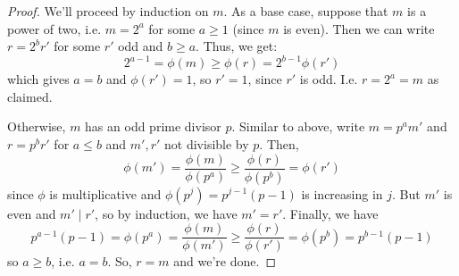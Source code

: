 \begin{proof}
    We'll proceed by induction on $m$. As a base case, suppose that $m$ is a power of two, i.e. $m = 2^a$ for some $a \geq 1$ (since $m$ is even). Then we can write $r = 2^br'$ for some $r'$ odd and $b \geq a$. Thus, we get:
    \[ 2^{a-1} = \phi(m) \geq \phi(r) = 2^{b-1}\phi(r') \]
    which gives $a = b$ and $\phi(r') = 1$, so $r' = 1$, since $r'$ is odd. I.e. $r = 2^a = m$ as claimed.

    Otherwise, $m$ has an odd prime divisor $p$. Similar to above, write $m = p^am'$ and $r = p^br'$ for $a \leq b$ and $m',r'$ not divisible by $p$. Then,
    \[ \phi(m') = \frac{\phi(m)}{\phi(p^a)} \geq \frac{\phi(r)}{\phi(p^b)} = \phi(r') \]
    since $\phi$ is multiplicative and $\phi(p^j) = p^{j-1}(p-1)$ is increasing in $j$. But $m'$ is even and $m' \mid r'$, so by induction, we have $m' = r'$. Finally, we have
    \[ p^{a-1}(p-1) = \phi(p^a) = \frac{\phi(m)}{\phi(m')} \geq \frac{\phi(r)}{\phi(r')} = \phi(p^b) = p^{b-1}(p-1) \]
    so $a \geq b$, i.e. $a = b$. So, $r=m$ and we're done.
\end{proof}
